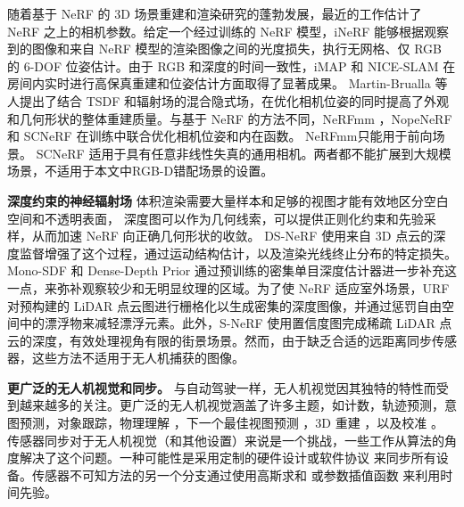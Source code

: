 随着基于 NeRF 的 3D 场景重建和渲染研究的蓬勃发展，最近的工作估计了 NeRF 之上的相机参数。给定一个经过训练的 NeRF 模型，iNeRF\cite{yen-chen_inerf_2021} 能够根据观察到的图像和来自 NeRF 模型的渲染图像之间的光度损失，执行无网格、仅 RGB 的 6-DOF 位姿估计。由于 RGB 和深度的时间一致性，iMAP\cite{sucar_imap_2021} 和 NICE-SLAM\cite{zhu_nice-slam_2022} 在房间内实时进行高保真重建和位姿估计方面取得了显著成果。 Martin-Brualla 等人提出了结合 TSDF 和辐射场的混合隐式场\cite{azinovic_neural_2022}，在优化相机位姿的同时提高了外观和几何形状的整体重建质量。与基于 NeRF 的方法不同，NeRFmm \cite{wang_nerf--_2022}，NopeNeRF\cite{bian_nope-nerf_2022} 和 SCNeRF \cite{jeong_self-calibrating_2021} 在训练中联合优化相机位姿和内在函数。 NeRFmm\cite{wang_nerf--_2022}只能用于前向场景。 SCNeRF\cite{jeong_self-calibrating_2021} 适用于具有任意非线性失真的通用相机。两者都不能扩展到大规模场景，不适用于本文中RGB-D错配场景的设置。

\textbf{深度约束的神经辐射场} 体积渲染需要大量样本和足够的视图才能有效地区分空白空间和不透明表面， 深度图可以作为几何线索，可以提供正则化约束和先验采样，从而加速 NeRF 向正确几何形状的收敛。 DS-NeRF \cite{deng_depth-supervised_2022} 使用来自 3D 点云的深度监督增强了这个过程，通过运动结构估计，以及渲染光线终止分布的特定损失。 Mono-SDF \cite{yu_monosdf_2022} 和 Dense-Depth Prior \cite{roessle_dense_2022} 通过预训练的密集单目深度估计器进一步补充这一点，来弥补观察较少和无明显纹理的区域。为了使 NeRF 适应室外场景，URF \cite{rematas_urban_2022} 对预构建的 LiDAR 点云图进行栅格化以生成密集的深度图像，并通过惩罚自由空间中的漂浮物来减轻漂浮元素。此外，S-NeRF \cite{xie_s-nerf_nodate} 使用置信度图完成稀疏 LiDAR 点云的深度，有效处理视角有限的街景场景。然而，由于缺乏合适的远距离同步传感器，这些方法不适用于无人机捕获的图像。

\textbf{更广泛的无人机视觉和同步。} 与自动驾驶一样，无人机视觉因其独特的特性而受到越来越多的关注。更广泛的无人机视觉涵盖了许多主题，如计数\cite{wen2021detection}\cite{hsieh2017drone}，轨迹预测\cite{pellegrini2009you}，意图预测\cite{xie2013inferring}，对象跟踪\cite{mueller2016benchmark}，物理理解\cite{zeng2020visual} ，下一个最佳视图预测 \cite{guedon2023macarons}，3D 重建 \cite{zhang2017distributed}，以及校准 \cite{rahimi2016uav}。
传感器同步对于无人机视觉（和其他设置）来说是一个挑战，一些工作从算法的角度解决了这个问题。一种可能性是采用定制的硬件设计或软件协议 \cite{ansari_wireless_2019} 来同步所有设备。传感器不可知方法的另一个分支通过使用高斯求和 \cite{elhayek_spatio-temporal_2012} 或参数插值函数 \cite{yang_asynchronous_2021} 来利用时间先验。

